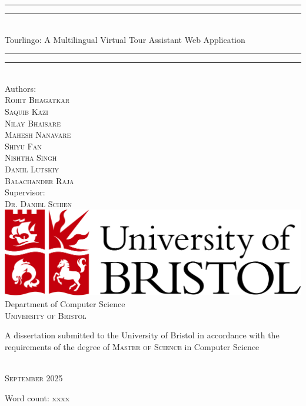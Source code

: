 \begin{titlepage}

\vspace*{13mm}

\begin{center}
\rule[0.5ex]{\linewidth}{2pt}\vspace*{-\baselineskip}\vspace*{3.2pt}
\rule[0.5ex]{\linewidth}{1pt}\\[\baselineskip]
{\LARGE Tourlingo: A Multilingual Virtual Tour Assistant Web Application}\\[4mm]
\rule[0.5ex]{\linewidth}{1pt}\vspace*{-\baselineskip}\vspace{3.2pt}
\rule[0.5ex]{\linewidth}{2pt}\\

\vspace{6.5mm}
{\large Authors: \\
\textsc{Rohit Bhagatkar} \\
\textsc{Saquib Kazi} \\
\textsc{Nilay Bhaisare} \\
\textsc{Mahesh Nanavare} \\
\textsc{Shiyu Fan} \\
\textsc{Nishtha Singh} \\
\textsc{Daniil Lutskiy} \\
\textsc{Balachander Raja}}\\

\vspace{6.5mm}
{\large Supervisor: \\
\textsc{Dr. Daniel Schien}}\\

\vspace{11mm}
\includegraphics[scale=0.2]{logos/bristollogo_colour}\\
\vspace{6mm}
{\large Department of Computer Science\\
\vspace{6mm}
\textsc{University of Bristol}}\\
\vspace{6mm}
\begin{minipage}{10cm}
A dissertation submitted to the University of Bristol in accordance with the requirements of the degree of \textsc{Master of Science} in Computer Science
\end{minipage}\\
\vspace{11mm}
{\large\textsc{September 2025}}
\vspace{11mm}
\end{center}

\begin{flushright}
{\small Word count: xxxx}
\end{flushright}

\end{titlepage}
